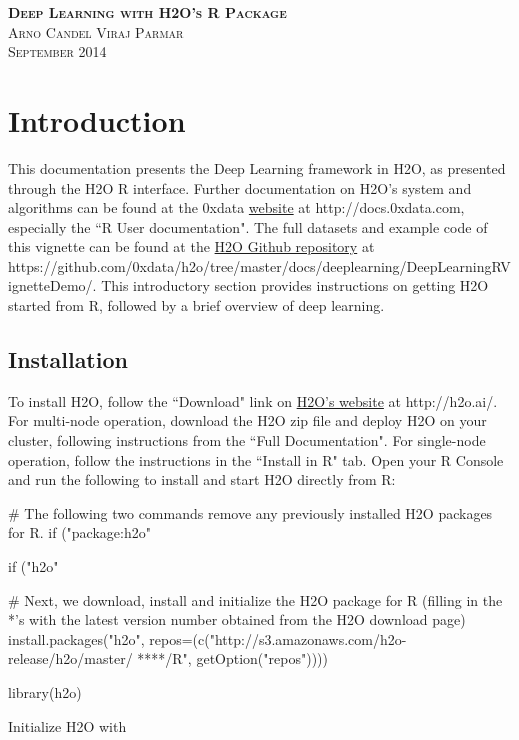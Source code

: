 \documentclass[11pt]{article}
\begin{document}
\thispagestyle{empty} %

\begin{center}
\textsc{\Large\bf{Deep Learning with H2O's R Package}}
\\
\bigskip
\textsc{\small{Arno Candel \hspace{40pt} Viraj Parmar}}
\\
\bigskip
\textsc{September 2014}
\end{center}

\tableofcontents

\newpage


\section{Introduction} \label{1}

This documentation presents the Deep Learning framework in H2O, as presented through the H2O R interface. Further documentation on H2O's system and algorithms can be found at the 0xdata \href{http://docs.0xdata.com}{website} at http://docs.0xdata.com, especially the ``R User documentation". The full datasets and example code of this vignette can be found at the \href{https://github.com/0xdata/h2o/tree/master/docs/deeplearning/DeepLearningRVignetteDemo}{H2O Github repository} at \\https://github.com/0xdata/h2o/tree/master/docs/deeplearning/DeepLearningRVignetteDemo/. This introductory section provides instructions on getting H2O started from R, followed by a brief overview of deep learning.

\subsection{Installation} \label{1.1}

To install H2O, follow the ``Download" link on \href{http://h2o.ai/}{H2O's website} at http://h2o.ai/. For multi-node operation, download the H2O zip file and deploy H2O on your cluster, following instructions from the ``Full Documentation". For single-node operation, follow the instructions in the ``Install in R" tab. Open your R Console and run the following to install and start H2O directly from R:

\begin{spverbatim}
# The following two commands remove any previously installed H2O packages for R.
if ("package:h2o" %

if ("h2o" %

# Next, we download, install and initialize the H2O package for R (filling in the *'s with the latest version number obtained from the H2O download page)
install.packages("h2o", repos=(c("http://s3.amazonaws.com/h2o-release/h2o/master/
****/R", getOption("repos"))))

library(h2o)

\end{spverbatim}
\noindent
Initialize H2O with
\end{document}
